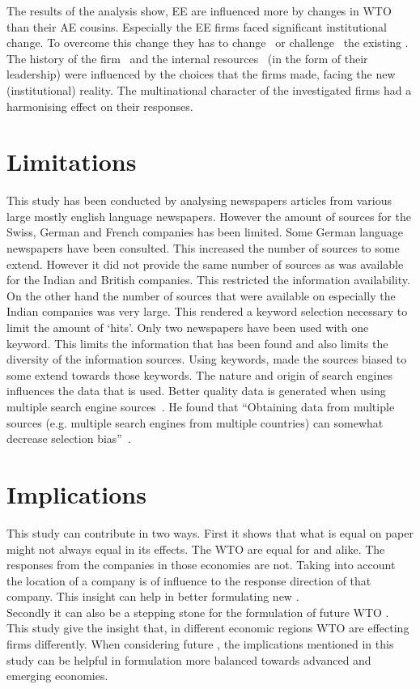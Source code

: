 The results of the analysis show, EE are influenced more by changes in WTO \rr than their AE cousins.
Especially the EE \pharma firms faced significant institutional change.
To overcome this change they has to change~\citep{Lawton:2009vw,Cantwell:2009hg} or challenge~\citep{Bartlett:1989vl} the existing \rr.\\
The history of the firm~\citep{Chittoor:2008cj} and the internal resources~\citep{Barney:1991ur} (in the form of their leadership) were influenced by the choices that the firms made, facing the new (institutional) reality.
The multinational character of the investigated firms had a harmonising effect on their responses.

\section{Limitations}
This study has been conducted by analysing newspapers articles from various large mostly english language newspapers. %
However the amount of sources for the Swiss, German and French companies has been limited.
Some German language newspapers have been consulted. 
This increased the number of sources to some extend.
However it did not provide the same number of sources as was available for the Indian and British companies.
This restricted the information availability.
On the other hand the number of sources that were available on especially the Indian companies was very large.
This rendered a keyword selection necessary to limit the amount of `hits'.
Only two newspapers have been used with one keyword. 
This limits the information that has been found and also limits the diversity of the information sources.
Using keywords, made the sources biased to some extend towards those keywords.
The nature and origin of search engines influences the data that is used.
Better quality data is generated when using multiple search engine sources~\citep{Torralba:2011uw}.
He found that ``Obtaining data from multiple sources (e.g. multiple search engines from multiple countries) can somewhat decrease selection bias''~\citep[p.1527]{Torralba:2011uw}.

\section{Implications}
This study can contribute in two ways.
First it shows that what is equal on paper might not always equal in its effects.
The WTO \rr are equal for  and  alike.
The responses from the companies in those economies are not.
Taking into account the location of a company is of influence to the response direction of that company.
This insight can help in better formulating new \rr.\\
Secondly it can also be a stepping stone for the formulation of future WTO \rr.
This study give the insight that, in different economic regions WTO \rr are effecting firms differently.
When considering future \rr, the implications mentioned in this study can be helpful in formulation more balanced \rr towards advanced and emerging economies.

